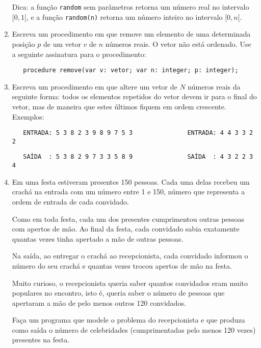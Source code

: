 \begin{enumerate}
Dica: a função \verb|random| sem parâmetros retorna um número real no intervalo
$[0,1[$, e a função \verb|random(n)| retorna um número inteiro no intervalo
$[0,n[$.

\item Escreva um procedimento em  que remove um
  elemento de uma determinada posição $p$ de um vetor $v$ de $n$ números
  reais. O vetor não está ordenado. 
  Use a seguinte assinatura para o procedimento: 

\verb!   procedure remove(var v: vetor; var n: integer; p: integer);!


\item Escreva um procedimento em  que altere um
  vetor de $N$ números reais da seguinte forma: todos os elementos
  repetidos do vetor devem ir para o final do vetor, mas de maneira
  que estes últimos fiquem em ordem crescente. Exemplos:

\verb!   ENTRADA: 5 3 8 2 3 9 8 9 7 5 3               ENTRADA: 4 4 3 3 2 2!

\vspace*{-1mm}
\verb!   SAÍDA  : 5 3 8 2 9 7 3 3 5 8 9               SAÍDA  : 4 3 2 2 3 4!

\item Em uma festa estiveram presentes 150 pessoas. Cada uma delas recebeu
um crachá na entrada com um número entre 1 e 150, número que
representa a ordem de entrada de cada convidado.

Como em toda festa, cada um dos presentes cumprimentou outras pessoas
com apertos de mão. Ao final da festa, cada convidado sabia exatamente
quantas vezes tinha apertado a mão de outras pessoas.

Na saída, ao entregar o crachá ao recepcionista, cada convidado
informou o número do seu crachá e quantas vezes trocou apertos de mão
na festa.

Muito curioso, o recepcionista queria saber quantos convidados eram
muito populares no encontro, isto é, queria saber o número de pessoas
que apertaram a mão de pelo menos outros 120 convidados.

Faça um programa
que modele o problema do recepcionista e que produza como saída o
número de celebridades (cumprimentadas pelo menos 120 vezes) presentes
na festa.


\end{enumerate}
